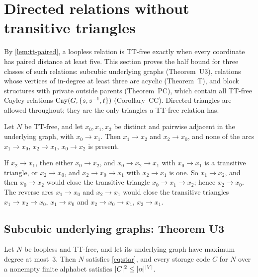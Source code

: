 \section{Directed relations without transitive triangles}\label{sec:directed}

By \cref{lem:tt-paired}, a loopless relation is TT-free exactly when every coordinate has paired distance at least
five. This section proves the half bound for three classes of such relations: subcubic underlying graphs
(Theorem~U3), relations whose vertices of in-degree at least three are acyclic (Theorem~T), and block structures with
private outside parents (Theorem~PC), which contain all TT-free Cayley relations $\operatorname{Cay}(G,\{s,s^{-1},t\})$
(Corollary~CC). Directed triangles are allowed throughout; they are the only triangles a TT-free relation has.

\begin{lemma}\label{lem:dtri}
Let $N$ be TT-free, and let $x_0,x_1,x_2$ be distinct and pairwise adjacent in the underlying graph, with
$x_0\to x_1$. Then $x_1\to x_2$ and $x_2\to x_0$, and none of the arcs $x_1\to x_0$, $x_2\to x_1$, $x_0\to x_2$ is
present.
\end{lemma}

\begin{outline}
If $x_2\to x_1$, then either $x_0\to x_2$, and $x_0\to x_2\to x_1$ with $x_0\to x_1$ is a transitive triangle, or
$x_2\to x_0$, and $x_2\to x_0\to x_1$ with $x_2\to x_1$ is one. So $x_1\to x_2$, and then $x_0\to x_2$ would close
the transitive triangle $x_0\to x_1\to x_2$; hence $x_2\to x_0$. The reverse arcs $x_1\to x_0$ and $x_2\to x_1$ would
close the transitive triangles $x_1\to x_2\to x_0$, $x_1\to x_0$ and $x_2\to x_0\to x_1$, $x_2\to x_1$.
\end{outline}

\subsection{Subcubic underlying graphs: Theorem U3}\label{sec:U3}

\begin{theorem}[Theorem U3]\label{thm:U3}
Let $N$ be loopless and TT-free, and let its underlying graph have maximum degree at most~$3$. Then $N$ satisfies
\eqref{eq:star}, and every storage code $C$ for $N$ over a nonempty finite alphabet satisfies
$\lvert C \rvert^2\le\lvert \alpha \rvert^{\lvert V \rvert}$.
\end{theorem}


